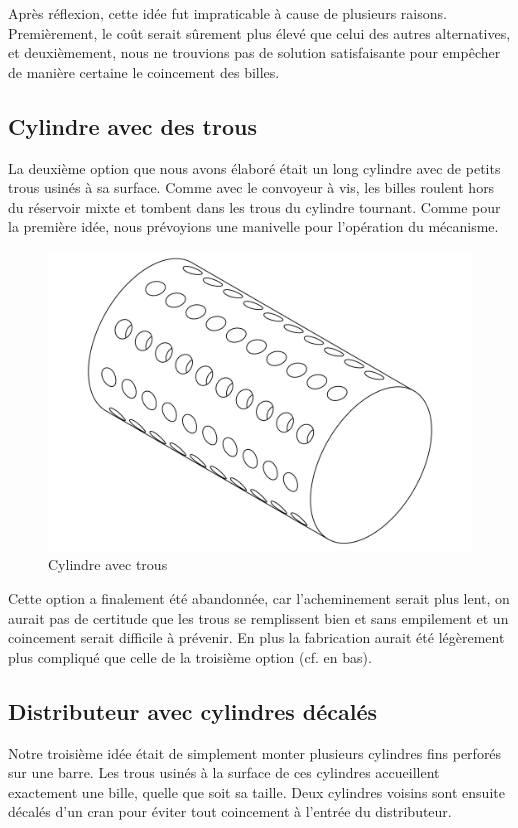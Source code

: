 Après réflexion, cette idée fut impraticable à cause de plusieurs raisons. Premièrement, le coût serait sûrement plus élevé que celui des autres alternatives, et deuxièmement, nous ne trouvions pas de solution satisfaisante pour empêcher de manière certaine le coincement des billes.

\subsection{Cylindre avec des trous}
La deuxième option que nous avons élaboré était un long cylindre avec de petits trous usinés à sa surface. Comme avec le convoyeur à vis, les billes roulent hors du réservoir mixte et tombent dans les trous du cylindre tournant. Comme pour la première idée, nous prévoyions une manivelle pour l'opération du mécanisme.

\begin{figure}
    \centering
    \includegraphics[width=\textwidth]{Graphics/Roue/DRAWING_PROTOTYP_CYLINDRE.pdf}
    \caption{Cylindre avec trous}
\end{figure}

Cette option a finalement été abandonnée, car l'acheminement serait plus lent, on aurait pas de certitude que les trous se remplissent bien et sans empilement et un coincement serait difficile à prévenir. En plus la fabrication aurait été légèrement plus compliqué que celle de la troisième option (cf. en bas).

\subsection{Distributeur avec cylindres décalés}
Notre troisième idée était de simplement monter plusieurs cylindres fins perforés sur une barre. Les trous usinés à la surface de ces cylindres accueillent exactement une bille, quelle que soit sa taille. Deux cylindres voisins sont ensuite décalés d'un cran pour éviter tout coincement à l'entrée du distributeur.

